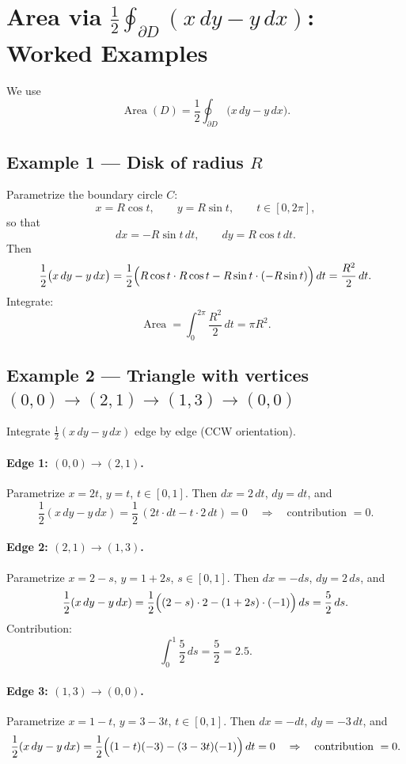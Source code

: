 \documentclass[11pt]{article}
\begin{document}
\section*{Area via \(\displaystyle \frac12\oint_{\partial D}(x\,dy-y\,dx)\): Worked Examples}

We use
\[
\operatorname{Area}(D)=\frac{1}{2}\oint_{\partial D} \bigl(x\,dy - y\,dx\bigr).
\]

\subsection*{Example 1 — Disk of radius \(R\)}
Parametrize the boundary circle \(C\):
\[
x=R\cos t,\qquad y=R\sin t,\qquad t\in[0,2\pi],
\]
so that
\[
dx=-R\sin t\,dt,\qquad dy=R\cos t\,dt.
\]
Then
\[
\frac12\bigl(x\,dy-y\,dx\bigr)
=
\frac12\Bigl(R\cos t\cdot R\cos t - R\sin t\cdot(-R\sin t)\Bigr)\,dt
=
\frac{R^{2}}{2}\,dt.
\]
Integrate:
\[
\operatorname{Area}
=
\int_{0}^{2\pi} \frac{R^{2}}{2}\,dt
=
\pi R^{2}.
\]

\subsection*{Example 2 — Triangle with vertices \((0,0)\to(2,1)\to(1,3)\to(0,0)\)}
Integrate \(\tfrac12(x\,dy-y\,dx)\) edge by edge (CCW orientation).

\paragraph{Edge 1: \((0,0)\to(2,1)\).}
Parametrize \(x=2t\), \(y=t\), \(t\in[0,1]\). Then \(dx=2\,dt\), \(dy=dt\), and
\[
\frac12(x\,dy-y\,dx)
=
\frac12\,(2t\cdot dt - t\cdot 2\,dt)
=
0
\quad\Rightarrow\quad \text{contribution }=0.
\]

\paragraph{Edge 2: \((2,1)\to(1,3)\).}
Parametrize \(x=2-s\), \(y=1+2s\), \(s\in[0,1]\). Then \(dx=-ds\), \(dy=2\,ds\), and
\[
\frac12(x\,dy-y\,dx)
=
\frac12\Bigl((2-s)\cdot 2 - (1+2s)\cdot(-1)\Bigr)\,ds
=
\frac{5}{2}\,ds.
\]
Contribution:
\[
\int_{0}^{1}\frac{5}{2}\,ds=\frac{5}{2}=2.5.
\]

\paragraph{Edge 3: \((1,3)\to(0,0)\).}
Parametrize \(x=1-t\), \(y=3-3t\), \(t\in[0,1]\). Then \(dx=-dt\), \(dy=-3\,dt\), and
\[
\frac12(x\,dy-y\,dx)
=
\frac12\Bigl((1-t)(-3) - (3-3t)(-1)\Bigr)\,dt
=
0
\quad\Rightarrow\quad \text{contribution }=0.
\]
\end{document}

